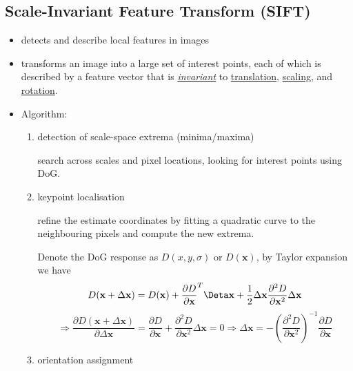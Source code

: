 \documentclass[twocolumn,landscape,10pt]{article}
\theoremstyle{definition}
\begin{document}
\subsection{Scale-Invariant Feature Transform (SIFT)}

\begin{itemize}
    \item detects and describe local features in images
    \item transforms an image into a large set of interest points, each of which
        is described by a feature vector that is \emph{\underline{invariant}} to
        \underline{translation}, \underline{scaling}, and \underline{rotation}.
    \item Algorithm:
        \begin{enumerate}
            \item detection of scale-space extrema (minima/maxima)

                search across scales and pixel locations, looking for interest
                points using DoG.

            \item keypoint localisation

                refine the estimate coordinates by fitting a quadratic curve to
                the neighbouring pixels and compute the new extrema.

                Denote the DoG response as $D(x,y,\sigma)$ or $D(\mathbf{x})$,
                by Taylor expansion we have
                \[
                    D(\mathbf{x}+\Delta \mathbf{x})=D(\mathbf{x})
                    +\frac{\partial D}{\partial \mathbf{x}}^T\Deta\mathbf{x}
                    +\frac{1}{2}\Delta\mathbf{x}\frac{\partial^2 D}{\partial
                    \mathbf{x}^2}\Delta\mathbf{x}
                \]
                \[
                    \Rightarrow
                    \frac{\partial
                    D(\mathbf{x}+\Delta\mathbf{x})}{\partial\Delta\mathbf{x}}
                    =\frac{\partial D}{\partial \mathbf{x}}
                    +\frac{\partial^2D}{\partial \mathbf{x}^2}\Delta\mathbf{x}
                    =0
                    \Rightarrow
                    \Delta\mathbf{x}=-{\left(\frac{\partial^2D}{\partial
                    \mathbf{x}^2}\right)}^{-1}\frac{\partial D}{\partial \mathbf{x}}
                \]

            \item orientation assignment


\end{enumerate}
\end{itemize}
\end{document}
